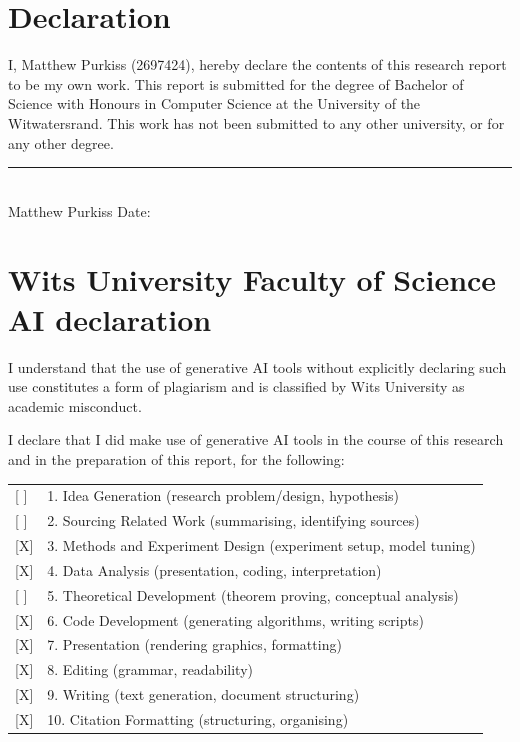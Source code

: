 \clearpage
\onecolumn
\section*{Declaration}

I, Matthew Purkiss (2697424), hereby declare the contents of this research report to be my own work. This report is submitted for the degree of Bachelor of Science with Honours in Computer Science at the University of the Witwatersrand. This work has not been submitted to any other university, or for any other degree.

\vspace{1.2cm}
\noindent\rule{6cm}{0.4pt}\\
Matthew Purkiss \hfill Date: 

\section*{Wits University Faculty of Science AI declaration}

I understand that the use of generative AI tools without explicitly declaring such use constitutes a form of plagiarism and is classified by Wits University as academic misconduct.

I declare that I did make use of generative AI tools in the course of this research and in the preparation of this report, for the following:

\begin{tabular}{@{}ll@{}}
  {[ ]} & 1. Idea Generation (research problem/design, hypothesis) \\
  {[ ]} & 2. Sourcing Related Work (summarising, identifying sources) \\
  {[X]} & 3. Methods and Experiment Design (experiment setup, model tuning) \\
  {[X]} & 4. Data Analysis (presentation, coding, interpretation) \\
  {[ ]} & 5. Theoretical Development (theorem proving, conceptual analysis) \\
  {[X]} & 6. Code Development (generating algorithms, writing scripts) \\
  {[X]} & 7. Presentation (rendering graphics, formatting) \\
  {[X]} & 8. Editing (grammar, readability) \\
  {[X]} & 9. Writing (text generation, document structuring) \\
  {[X]} & 10. Citation Formatting (structuring, organising) \\
\end{tabular}

